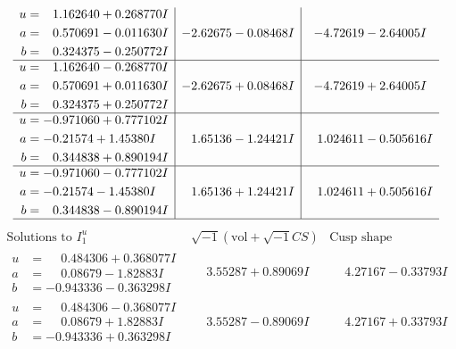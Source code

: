 \documentclass[1p]{elsarticle_modified}
\theoremstyle{definition}
\newcommand{\I}{\sqrt{-1}}
\begin{document}
$$\begin{array}{c|c|c}
\begin{aligned}
u &= \phantom{-}1.162640 + 0.268770 I \\
a &= \phantom{-}0.570691 - 0.011630 I \\
b &= \phantom{-}0.324375 - 0.250772 I\end{aligned}
 & -2.62675 - 0.08468 I & -4.72619 - 2.64005 I \\ \hline\begin{aligned}
u &= \phantom{-}1.162640 - 0.268770 I \\
a &= \phantom{-}0.570691 + 0.011630 I \\
b &= \phantom{-}0.324375 + 0.250772 I\end{aligned}
 & -2.62675 + 0.08468 I & -4.72619 + 2.64005 I \\ \hline\begin{aligned}
u &= -0.971060 + 0.777102 I \\
a &= -0.21574 + 1.45380 I \\
b &= \phantom{-}0.344838 + 0.890194 I\end{aligned}
 & \phantom{-}1.65136 - 1.24421 I & \phantom{-}1.024611 - 0.505616 I \\ \hline\begin{aligned}
u &= -0.971060 - 0.777102 I \\
a &= -0.21574 - 1.45380 I \\
b &= \phantom{-}0.344838 - 0.890194 I\end{aligned}
 & \phantom{-}1.65136 + 1.24421 I & \phantom{-}1.024611 + 0.505616 I\\
 \hline 
 \end{array}$$\newpage$$\begin{array}{c|c|c}  
\text{Solutions to }I^u_{1}& \I (\text{vol} + \sqrt{-1}CS) & \text{Cusp shape}\\
 \hline 
\begin{aligned}
u &= \phantom{-}0.484306 + 0.368077 I \\
a &= \phantom{-}0.08679 - 1.82883 I \\
b &= -0.943336 - 0.363298 I\end{aligned}
 & \phantom{-}3.55287 + 0.89069 I & \phantom{-}4.27167 - 0.33793 I \\ \hline\begin{aligned}
u &= \phantom{-}0.484306 - 0.368077 I \\
a &= \phantom{-}0.08679 + 1.82883 I \\
b &= -0.943336 + 0.363298 I\end{aligned}
 & \phantom{-}3.55287 - 0.89069 I & \phantom{-}4.27167 + 0.33793 I \\ \hline\begin{aligned}

\end{aligned}
\end{array}$$
\end{document}
